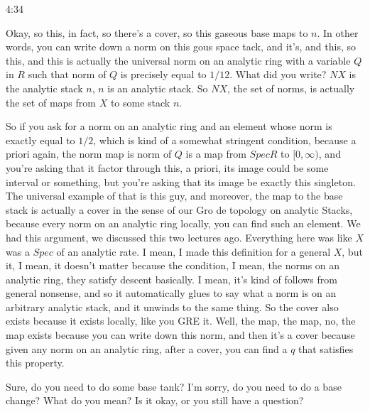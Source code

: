 \begin{unfinished}{4:34}
\begin{example}
\begin{example}
\begin{example}
Okay, so this, in fact, so there's a cover, so this gaseous base maps to $n$. In other words, you can write down a norm on this gous space tack, and it's, and this, so this, and this is actually the universal norm on an analytic ring with a variable $Q$ in $R$ such that norm of $Q$ is precisely equal to $1/12$. What did you write? $NX$ is the analytic stack $n$, $n$ is an analytic stack. So $NX$, the set of norms, is actually the set of maps from $X$ to some stack $n$.

So if you ask for a norm on an analytic ring and an element whose norm is exactly equal to $1/2$, which is kind of a somewhat stringent condition, because a priori again, the norm map is norm of $Q$ is a map from $Spec R$ to $[0, \infty)$, and you're asking that it factor through this, a priori, its image could be some interval or something, but you're asking that its image be exactly this singleton. The universal example of that is this guy, and moreover, the map to the base stack is actually a cover in the sense of our Gro de topology on analytic Stacks, because every norm on an analytic ring locally, you can find such an element. We had this argument, we discussed this two lectures ago. Everything here was like $X$ was a $Spec$ of an analytic rate. I mean, I made this definition for a general $X$, but it, I mean, it doesn't matter because the condition, I mean, the norms on an analytic ring, they satisfy descent basically. I mean, it's kind of follows from general nonsense, and so it automatically glues to say what a norm is on an arbitrary analytic stack, and it unwinds to the same thing. So the cover also exists because it exists locally, like you GRE it. Well, the map, the map, no, the map exists because you can write down this norm, and then it's a cover because given any norm on an analytic ring, after a cover, you can find a $q$ that satisfies this property.

Sure, do you need to do some base tank? I'm sorry, do you need to do a base change? What do you mean? Is it okay, or you still have a question?


\end{example}
\end{example}
\end{example}
\end{unfinished}

